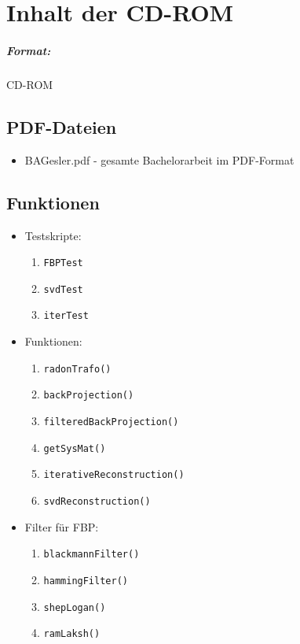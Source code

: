 \chapter{Inhalt der CD-ROM}
\label{app:cdrom}

\paragraph{Format:} 
		CD-ROM


\section{PDF-Dateien}
\begin{itemize}
	\item BAGesler.pdf - gesamte Bachelorarbeit im PDF-Format 
\end{itemize}


\section{\MATLAB Funktionen}

\begin{itemize}
	
	\item Testskripte:
	\begin{enumerate}
		\item \verb|FBPTest|
		\item \verb|svdTest|
		\item \verb|iterTest|
	\end{enumerate}
	
	\item Funktionen:
	\begin{enumerate}
		\item \verb|radonTrafo()|
		\item \verb|backProjection()|
		\item \verb|filteredBackProjection()|
		\item \verb|getSysMat()|
		\item \verb|iterativeReconstruction()|
		\item \verb|svdReconstruction()|	
	\end{enumerate}

	\item Filter für FBP:
	\begin{enumerate}
		\item \verb|blackmannFilter()|
		\item \verb|hammingFilter()|
		\item \verb|shepLogan()|
		\item \verb|ramLaksh()|
	\end{enumerate}

\end{itemize}